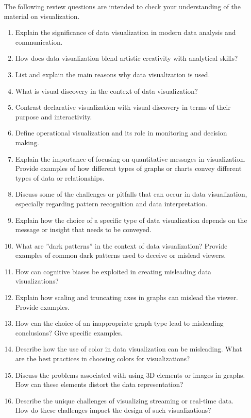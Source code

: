 The following review questions are intended to check your understanding of the material on visualization.

\begin{enumerate}[nosep]
    \item Explain the significance of data visualization in modern data analysis and communication.
    \item How does data visualization blend artistic creativity with analytical skills?
    \item List and explain the main reasons why data visualization is used.
    \item What is visual discovery in the context of data visualization?
    \item Contrast declarative visualization with visual discovery in terms of their purpose and interactivity.
    \item Define operational visualization and its role in monitoring and decision making.
    \item Explain the importance of focusing on quantitative messages in visualization. Provide examples of how different types of graphs or charts convey different types of data or relationships.
    \item Discuss some of the challenges or pitfalls that can occur in data visualization, especially regarding pattern recognition and data interpretation.
    \item Explain how the choice of a specific type of data visualization depends on the message or insight that needs to be conveyed.
    \item What are ''dark patterns'' in the context of data visualization? Provide examples of common dark patterns used to deceive or mislead viewers.
    \item How can cognitive biases be exploited in creating misleading data visualizations?
    \item Explain how scaling and truncating axes in graphs can mislead the viewer. Provide examples.
    \item How can the choice of an inappropriate graph type lead to misleading conclusions? Give specific examples.
    \item Describe how the use of color in data visualization can be misleading. What are the best practices in choosing colors for visualizations?
    \item Discuss the problems associated with using 3D elements or images in graphs. How can these elements distort the data representation?
    \item Describe the unique challenges of visualizing streaming or real-time data. How do these challenges impact the design of such visualizations?

\end{enumerate}
